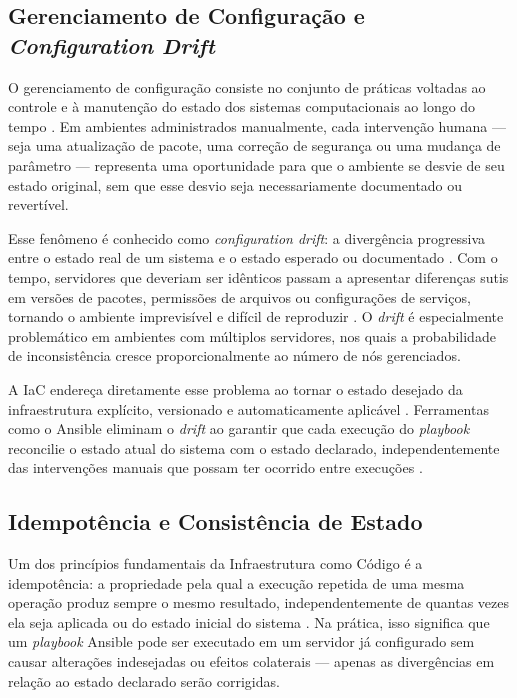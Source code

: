 \documentclass[12pt]{article}
\begin{document}
\subsection{Gerenciamento de Configuração e \textit{Configuration Drift}}

O gerenciamento de configuração consiste no conjunto de práticas voltadas
ao controle e à manutenção do estado dos sistemas computacionais ao longo
do tempo \cite{morris2016}. Em ambientes administrados manualmente, cada
intervenção humana — seja uma atualização de pacote, uma correção de
segurança ou uma mudança de parâmetro — representa uma oportunidade para
que o ambiente se desvie de seu estado original, sem que esse desvio seja
necessariamente documentado ou revertível.
 
Esse fenômeno é conhecido como \textit{configuration drift}: a divergência
progressiva entre o estado real de um sistema e o estado esperado ou
documentado \cite{redhat2022}. Com o tempo, servidores que deveriam ser
idênticos passam a apresentar diferenças sutis em versões de pacotes,
permissões de arquivos ou configurações de serviços, tornando o ambiente
imprevisível e difícil de reproduzir \cite{pucminas}. O \textit{drift}
é especialmente problemático em ambientes com múltiplos servidores, nos
quais a probabilidade de inconsistência cresce proporcionalmente ao
número de nós gerenciados.
 
A IaC endereça diretamente esse problema ao tornar o estado desejado da
infraestrutura explícito, versionado e automaticamente aplicável
\cite{morris2016}. Ferramentas como o Ansible eliminam o \textit{drift}
ao garantir que cada execução do \textit{playbook} reconcilie o estado
atual do sistema com o estado declarado, independentemente das
intervenções manuais que possam ter ocorrido entre execuções
\cite{alcidesmaya}.

\subsection{Idempotência e Consistência de Estado}

Um dos princípios fundamentais da Infraestrutura como Código é a
idempotência: a propriedade pela qual a execução repetida de uma mesma
operação produz sempre o mesmo resultado, independentemente de quantas
vezes ela seja aplicada ou do estado inicial do sistema \cite{morris2016}.
Na prática, isso significa que um \textit{playbook} Ansible pode ser
executado em um servidor já configurado sem causar alterações indesejadas
ou efeitos colaterais --- apenas as divergências em relação ao estado
declarado serão corrigidas.
\end{document}
